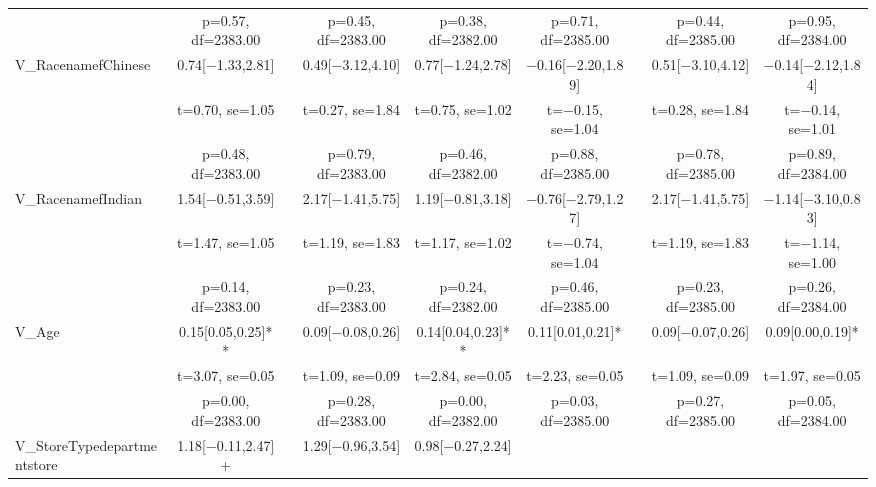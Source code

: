 \documentclass[]{report}
\begin{document}
\begin{table}
{\begin{tabular}[t]{lcccccccc}
			& p=\num{0.57}, df=\num{2383.00} &  & p=\num{0.45}, df=\num{2383.00} & p=\num{0.38}, df=\num{2382.00} & p=\num{0.71}, df=\num{2385.00} &  & p=\num{0.44}, df=\num{2385.00} & p=\num{0.95}, df=\num{2384.00}\\
			V\_RacenamefChinese & \num{0.74}[\num{-1.33},\num{2.81}] &  & \num{0.49}[\num{-3.12},\num{4.10}] & \num{0.77}[\num{-1.24},\num{2.78}] & \num{-0.16}[\num{-2.20},\num{1.89}] &  & \num{0.51}[\num{-3.10},\num{4.12}] & \num{-0.14}[\num{-2.12},\num{1.84}]\\
			& t=\num{0.70}, se=\num{1.05} &  & t=\num{0.27}, se=\num{1.84} & t=\num{0.75}, se=\num{1.02} & t=\num{-0.15}, se=\num{1.04} &  & t=\num{0.28}, se=\num{1.84} & t=\num{-0.14}, se=\num{1.01}\\
			& p=\num{0.48}, df=\num{2383.00} &  & p=\num{0.79}, df=\num{2383.00} & p=\num{0.46}, df=\num{2382.00} & p=\num{0.88}, df=\num{2385.00} &  & p=\num{0.78}, df=\num{2385.00} & p=\num{0.89}, df=\num{2384.00}\\
			V\_RacenamefIndian & \num{1.54}[\num{-0.51},\num{3.59}] &  & \num{2.17}[\num{-1.41},\num{5.75}] & \num{1.19}[\num{-0.81},\num{3.18}] & \num{-0.76}[\num{-2.79},\num{1.27}] &  & \num{2.17}[\num{-1.41},\num{5.75}] & \num{-1.14}[\num{-3.10},\num{0.83}]\\
			& t=\num{1.47}, se=\num{1.05} &  & t=\num{1.19}, se=\num{1.83} & t=\num{1.17}, se=\num{1.02} & t=\num{-0.74}, se=\num{1.04} &  & t=\num{1.19}, se=\num{1.83} & t=\num{-1.14}, se=\num{1.00}\\
			& p=\num{0.14}, df=\num{2383.00} &  & p=\num{0.23}, df=\num{2383.00} & p=\num{0.24}, df=\num{2382.00} & p=\num{0.46}, df=\num{2385.00} &  & p=\num{0.23}, df=\num{2385.00} & p=\num{0.26}, df=\num{2384.00}\\
			V\_Age & \num{0.15}[\num{0.05},\num{0.25}]** &  & \num{0.09}[\num{-0.08},\num{0.26}] & \num{0.14}[\num{0.04},\num{0.23}]** & \num{0.11}[\num{0.01},\num{0.21}]* &  & \num{0.09}[\num{-0.07},\num{0.26}] & \num{0.09}[\num{0.00},\num{0.19}]*\\
			& t=\num{3.07}, se=\num{0.05} &  & t=\num{1.09}, se=\num{0.09} & t=\num{2.84}, se=\num{0.05} & t=\num{2.23}, se=\num{0.05} &  & t=\num{1.09}, se=\num{0.09} & t=\num{1.97}, se=\num{0.05}\\
			& p=\num{0.00}, df=\num{2383.00} &  & p=\num{0.28}, df=\num{2383.00} & p=\num{0.00}, df=\num{2382.00} & p=\num{0.03}, df=\num{2385.00} &  & p=\num{0.27}, df=\num{2385.00} & p=\num{0.05}, df=\num{2384.00}\\
			V\_StoreTypedepartmentstore & \num{1.18}[\num{-0.11},\num{2.47}]+ &  & \num{1.29}[\num{-0.96},\num{3.54}] & \num{0.98}[\num{-0.27},\num{2.24}] &  &  &  & \\

\end{tabular}}
\end{table}
\end{document}
